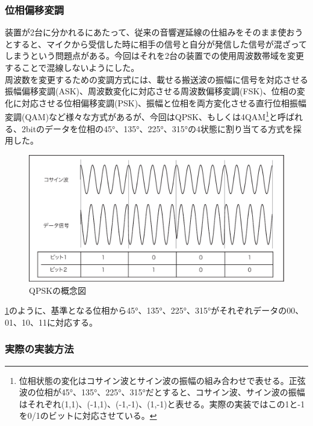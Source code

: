 \documentclass[a4paper,report]{jsbook}
\begin{document}
\subsubsection{位相偏移変調}\label{ux4f4dux76f8ux504fux79fbux5909ux8abf}

装置が2台に分かれるにあたって、従来の音響遅延線の仕組みをそのまま使おうとすると、マイクから受信した時に相手の信号と自分が発信した信号が混ざってしまうという問題点がある。今回はそれを2台の装置での使用周波数帯域を変更することで混線しないようにした。\\
周波数を変更するための変調方式には、載せる搬送波の振幅に信号を対応させる振幅偏移変調(ASK)、周波数変化に対応させる周波数偏移変調(FSK)、位相の変化に対応させる位相偏移変調(PSK)、振幅と位相を両方変化させる直行位相振幅変調(QAM)など様々な方式があるが、今回はQPSK、もしくは4QAM\footnote{位相状態の変化はコサイン波とサイン波の振幅の組み合わせで表せる。正弦波の位相が45°、135°、225°、315°だとすると、コサイン波、サイン波の振幅はそれぞれ(1,1)、(-1,1)、(-1,-1)、(1,-1)と表せる。実際の実装ではこの1と-1を0/1のビットに対応させている。}と呼ばれる、2bitのデータを位相の45°、135°、225°、315°の4状態に割り当てる方式を採用した。

\begin{figure}[htbp]
\centering
\includegraphics[width=1.00000\textwidth]{./img/qpsk_setsumei.pdf}
\caption{QPSKの概念図\label{fig:qpsk}}
\end{figure}

\cref{fig:qpsk}のように、基準となる位相から45°、135°、225°、315°がそれぞれデータの00、01、10、11に対応する。

\subsubsection{実際の実装方法}\label{ux5b9fux969bux306eux5b9fux88c5ux65b9ux6cd5}
\end{document}
